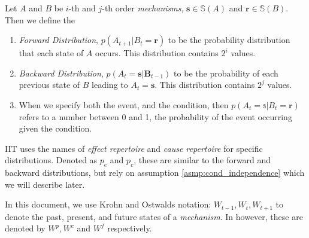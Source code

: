 \begin{definition}
	\label{def:distributions}
	Let $A$ and $B$ be $i$-th and $j$-th order \textit{mechanisms}, $\mathbf{s} \in \mathbb{S}(A)$ and $\mathbf{r} \in \mathbb{S}(B)$. Then we define the
	\begin{enumerate}
		\item \textit{Forward Distribution}, $p(A_{t+1}|B_t = \mathbf{r})$ to be the probability distribution that each state of $A$ occurs. This distribution contains $2^i$ values.
		\item \textit{Backward Distribution}, $p(A_{t}=\mathbf{s}|\mathbf{B}_{t-1})$ to be the probability of each previous state of $B$ leading to $A_t = \mathbf{s}$. This distribution contains $2^j$ values.
		\item When we specify both the event, and the condition, then $p(A_t = \mathbb{s}|B_t = \mathbf{r})$ refers to a number between 0 and 1, the probability of the event occurring given the condition.
	\end{enumerate}
\end{definition}



\begin{definition}
	{IIT \cite{oizumi2014phenomenology} uses the names of \textit{effect repertoire} and \textit{cause repertoire} for specific distributions. Denoted as $p_e$ and $p_c$, these are similar to the forward and backward distributions, but rely on assumption \ref{asmp:cond_independence} which we will describe later. }
\end{definition}


\begin{remark}
	In this document, we use Krohn and Ostwalds  \cite{krohn2016computing} notation: $W_{t-1}, W_t, W_{t+1}$ to denote the past, present, and future states of a \textit{mechanism}. In \cite{oizumi2014phenomenology} however, these are denoted by $W^p, W^c$ and $W^f$ respectively.
\end{remark}

